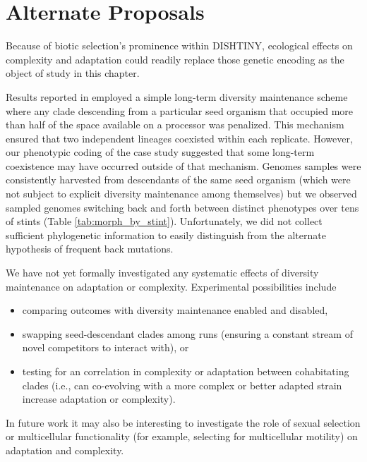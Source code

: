 \section{Alternate Proposals}

Because of biotic selection's prominence within DISHTINY, ecological effects on complexity and adaptation could readily replace those genetic encoding as the object of study in this chapter.

Results reported in \citep{moreno2021case} employed a simple long-term diversity maintenance scheme where any clade descending from a particular seed organism that occupied more than half of the space available on a processor was penalized.
This mechanism ensured that two independent lineages coexisted within each replicate.
However, our phenotypic coding of the case study suggested that some long-term coexistence may have occurred outside of that mechanism.
Genomes samples were consistently harvested from descendants of the same seed organism (which were not subject to explicit diversity maintenance among themselves) but we observed sampled genomes switching back and forth between distinct phenotypes over tens of stints (Table \ref{tab:morph_by_stint}).
Unfortunately, we did not collect sufficient phylogenetic information to easily distinguish from the alternate hypothesis of frequent back mutations.

We have not yet formally investigated any systematic effects of diversity maintenance on adaptation or complexity.
Experimental possibilities include
\begin{itemize}
\item comparing outcomes with diversity maintenance enabled and disabled,
\item swapping seed-descendant clades among runs (ensuring a constant stream of novel competitors to interact with), or
\item testing for an correlation in complexity or adaptation between cohabitating clades (i.e., can co-evolving with a more complex or better adapted strain increase adaptation or complexity).
\end{itemize}

In future work it may also be interesting to investigate the role of sexual selection or multicellular functionality (for example, selecting for multicellular motility) on adaptation and complexity.

